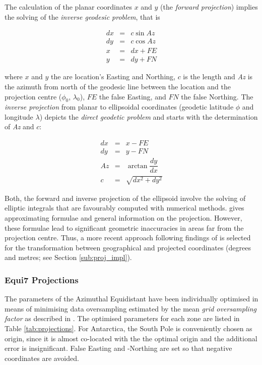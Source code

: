 \documentclass[11pt,a4paper]{article}
\begin{document}
The calculation of the planar coordinates $x$ and $y$ (the \textit{forward projection}) implies the solving of the \textit{inverse geodesic problem}, that is

\begin{eqnarray}
dx &=& c \sin Az \\ 
dy &=& c \cos Az \\
x &=& dx + FE \\
y &=& dy + FN
\end{eqnarray}

where $x$ and $y$ the are location's Easting and Northing, $c$ is the length and \textit{Az} is the azimuth from north of the geodesic line between the location and the projection centre ($\phi_{0}$, $\lambda_{0}$), $FE$ the false Easting, and $FN$ the false Northing. The \textit{inverse projection} from planar to ellipsoidal coordinates (geodetic latitude $\phi$ and longitude $\lambda$) depicts the \textit{direct geodetic problem} and starts with the determination of \textit{Az} and $c$:

\begin{eqnarray}
dx &=& x - FE \\
dy &=& y - FN \\
\mathit{Az} &=& \arctan \dfrac{dy}{dx} \\
c &=& \sqrt{dx^2 + dy^2}
\end{eqnarray}

Both, the forward and inverse projection of the ellipsoid involve the solving of elliptic integrals that are favourably computed with numerical methods. \cite{Snyder1987} gives approximating formulae and general information on the projection. However, these formulae lead to significant geometric inaccuracies in areas far from the projection centre. Thus, a more recent approach following findings of \citep{Karney2011, Karney2013} is selected for the transformation between geographical and projected coordinates (degrees and metres; see Section \ref{sub:proj_impl}).

\subsubsection{Equi7 Projections}

The parameters of the Azimuthal Equidistant have been individually optimised in means of minimising data oversampling estimated by the mean \textit{grid oversampling factor} as described in \cite{Bauer-Marschallinger2014}. The optimised parameters for each zone are listed in Table \ref{tab:projections}. For Antarctica, the South Pole is conveniently chosen as origin, since it is almost co-located with the the optimal origin and the additional error is insignificant. False Easting and -Northing are set so that negative coordinates are avoided. 
\end{document}
